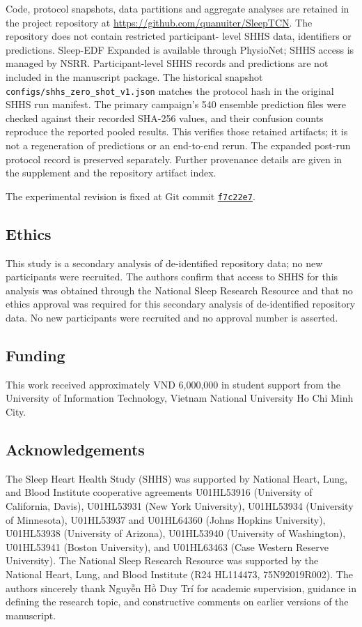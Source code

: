 \documentclass[11pt,a4paper]{article}
\begin{document}
Code, protocol snapshots, data partitions and aggregate analyses are retained in the project repository
at \url{https://github.com/quanuiter/SleepTCN}. The repository does not contain restricted participant-
level SHHS data, identifiers or predictions.
Sleep-EDF Expanded is available through PhysioNet; SHHS access is managed by NSRR. Participant-level
SHHS records and predictions are not included in the manuscript package. The historical snapshot
\texttt{configs/shhs\_zero\_shot\_v1.json} matches the protocol hash in the original SHHS run manifest.
The primary campaign's 540 ensemble prediction files were checked against their recorded SHA-256 values,
and their confusion counts reproduce the reported pooled results. This verifies those retained artifacts;
it is not a regeneration of predictions or an end-to-end rerun. The expanded post-run protocol record
is preserved separately. Further provenance details are given in the supplement and the repository
artifact index.

The experimental revision is fixed at Git commit
\href{https://github.com/quanuiter/SleepTCN/commit/f7c22e76022b8e24ac8d1343a39a990d42a1b3e2}{\texttt{f7c22e7}}.

\subsection*{Ethics}

This study is a secondary analysis of de-identified repository data; no new participants were recruited.
The authors confirm that access to SHHS for this analysis was obtained through the National Sleep
Research Resource and that no ethics approval was required for this secondary analysis of de-identified
repository data. No new participants were recruited and no approval number is asserted.

\subsection*{Funding}

This work received approximately VND 6,000,000 in student support from the University of Information
Technology, Vietnam National University Ho Chi Minh City.

\subsection*{Acknowledgements}
The Sleep Heart Health Study (SHHS) was supported by National Heart, Lung, and Blood Institute
cooperative agreements U01HL53916 (University of California, Davis), U01HL53931 (New York
University), U01HL53934 (University of Minnesota), U01HL53937 and U01HL64360 (Johns Hopkins
University), U01HL53938 (University of Arizona), U01HL53940 (University of Washington), U01HL53941
(Boston University), and U01HL63463 (Case Western Reserve University). The National Sleep Research
Resource was supported by the National Heart, Lung, and Blood Institute (R24 HL114473,
75N92019R002). The authors sincerely thank Nguy\~{\^e}n H\`{\^o} Duy Tr\'i for academic supervision, guidance in
defining the research topic, and constructive comments on earlier versions of the manuscript.
\end{document}
